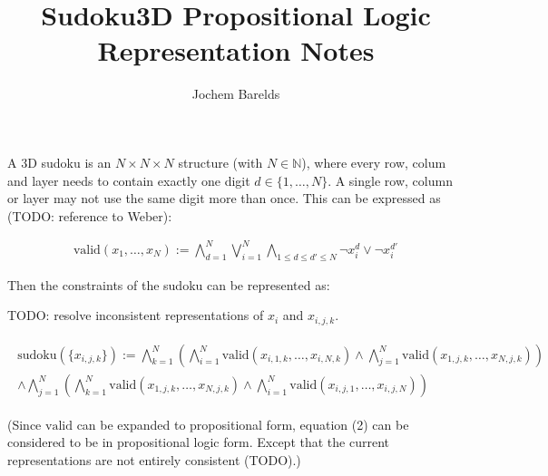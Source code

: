 \documentclass[11pt]{article}
\title{\textbf{Sudoku3D Propositional Logic Representation Notes}}
\author{Jochem Barelds}
\date{}
\begin{document}
\maketitle

A 3D sudoku is an $N \times N \times N$ structure (with $N \in \mathbb{N}$), where every row, colum and layer needs to contain exactly one digit $d \in \{1, \hdots, N\}$. A single row, column or layer may not use the same digit more than once. This can be expressed as (TODO: reference to Weber):

\begin{align}
	\text{valid}(x_1, \hdots, x_N) := \bigwedge_{d=1}^{N} \bigvee_{i=1}^{N} \bigwedge_{1 \leq d \leq d' \leq N} \neg x_i^{d} \vee \neg x_i^{d'} 
\end{align}

Then the constraints of the sudoku can be represented as:

TODO: resolve inconsistent representations of $x_i$ and $x_{i,j,k}$.

\begin{align}
\begin{split}
	\text{sudoku}(\{x_{i,j,k}\}) := \bigwedge_{k=1}^{N} (\bigwedge_{i=1}^{N} \text{valid}(x_{i,1,k}, \hdots, x_{i,N,k}) \wedge \bigwedge_{j=1}^{N} \text{valid}(x_{1,j,k}, \hdots, x_{N,j,k})) \\
	\wedge \bigwedge_{j=1}^{N} (\bigwedge_{k=1}^{N} \text{valid}(x_{1,j,k}, \hdots, x_{N,j,k}) \wedge \bigwedge_{i=1}^{N} \text{valid}(x_{i,j,1}, \hdots, x_{i,j,N}))
\end{split}
\end{align}

(Since $\text{valid}$ can be expanded to propositional form, equation (2) can be considered to be in propositional logic form. Except that the current representations are not entirely consistent (TODO).)
\end{document}
